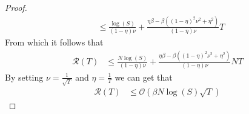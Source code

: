 \begin{proof}
\begin{align*}
         &\leq  \frac{\log(S)}{(1-\eta)\nu } + \frac{\eta \beta-\beta ( (1-\eta)^2\nu^2 + \eta^2)}{(1-\eta)\nu }T
    \end{align*}
    From which it follows that
    \begin{align*}
        \mathcal R(T) &\leq  \frac{N\log(S)}{(1-\eta)\nu } + \frac{\eta \beta-\beta ( (1-\eta)^2\nu^2 + \eta^2)}{(1-\eta)\nu }NT %
    \end{align*}
    By setting $\nu = \frac{1}{\sqrt{T}}$ and $\eta = \frac{1}{T}$ we can get that 
    \begin{align*}
        \mathcal R(T) &\leq  \mathcal O (\beta N\log(S) \sqrt{T})
    \end{align*}
\end{proof}


